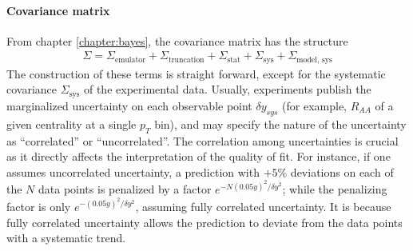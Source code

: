 \paragraph{Covariance matrix} 
From chapter \ref{chapter:bayes}, the covariance matrix has the structure
\begin{eqnarray}
\Sigma = \Sigma_{\textrm{emulator}} + \Sigma_{\textrm{truncation}} + \Sigma_{\textrm{stat}} + \Sigma_{\textrm{sys}} + \Sigma_{\textrm{model, sys}} 
\end{eqnarray}
The construction of these terms is straight forward, except for the systematic covariance $\Sigma_{\textrm{sys}}$ of the experimental data.
Usually, experiments publish the marginalized uncertainty on each observable point $\delta y_{sys}$ (for example, $R_{AA}$ of a given centrality at a single $p_T$ bin), and may specify the nature of the uncertainty as ``correlated'' or ``uncorrelated''.
The correlation among uncertainties is crucial as it directly affects the interpretation of the quality of fit.
For instance,  if one assumes uncorrelated uncertainty, a prediction with $+5\%$ deviations on each of the $N$ data points is penalized by a factor $e^{-N(0.05 y)^2/\delta y^2}$; while the penalizing factor is only $e^{-(0.05 y)^2/\delta y^2}$,  assuming fully correlated uncertainty.
It is because fully correlated uncertainty allows the prediction to deviate from the data points with a systematic trend.

